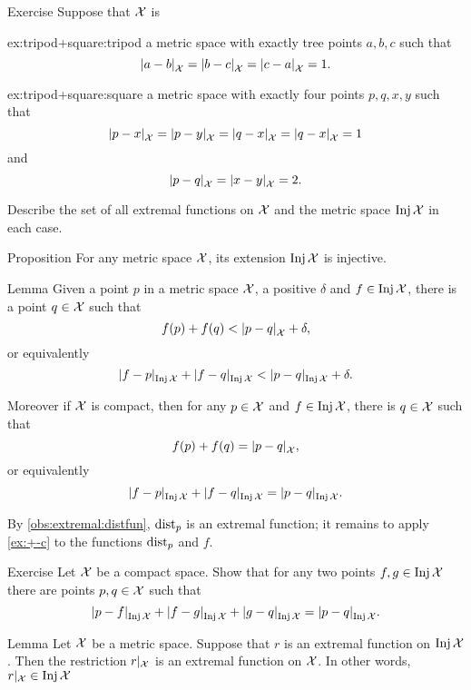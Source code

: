 \begin{thm}{Exercise}\label{ex:tripod+square}
Suppose that $\mathcal{X}$ is
\begin{subthm}{ex:tripod+square:tripod} 
a metric space with exactly tree points $a,b,c$ such that 
\[\dist{a}{b}{\spc{X}}=\dist{b}{c}{\spc{X}}=\dist{c}{a}{\spc{X}}=1.\]
\end{subthm}
\begin{subthm}{ex:tripod+square:square}
 a metric space with exactly four points $p,q,x,y$ such that 
\[\dist{p}{x}{\spc{X}}=\dist{p}{y}{\spc{X}}=\dist{q}{x}{\spc{X}}=\dist{q}{x}{\spc{X}}=1\]
and
\[\dist{p}{q}{\spc{X}}=\dist{x}{y}{\spc{X}}=2.\]
\end{subthm}
Describe the set of all extremal functions on $\mathcal{X}$ and the metric space $\mathop{\rm Inj}\nolimits \mathcal{X}$ in each case.
\end{thm}

\begin{thm}{Proposition}\label{prop:InjX-is-injective}
For any metric space $\mathcal{X}$, its extension $\mathop{\rm Inj}\nolimits\mathcal{X}$ is  injective.
\end{thm}

\begin{thm}{Lemma}\label{lem:opposite}
Given a point $p$ in a metric space $\mathcal{X}$, a positive $\delta$ and $f\in \mathop{\rm Inj}\nolimits\mathcal{X}$, there is a point $q\in \mathcal{X}$
such that 
\[f(p)+f(q)<\dist{p}{q}{\spc{X}}+\delta,\]
or equivalently 
\[\dist{f}{p}{\Inj\spc{X}}+\dist{f}{q}{\Inj\spc{X}}<\dist{p}{q}{\Inj\spc{X}}+\delta.\]

Moreover if $\mathcal{X}$ is compact, then for any $p\in\mathcal{X}$ and $f\in \mathop{\rm Inj}\nolimits\mathcal{X}$, there is $q\in \mathcal{X}$ such that 
\[f(p)+f(q)=\dist{p}{q}{\spc{X}},\]
or equivalently 
\[\dist{f}{p}{\Inj\spc{X}}+\dist{f}{q}{\Inj\spc{X}}=\dist{p}{q}{\Inj\spc{X}}.\]
\end{thm}

By \ref{obs:extremal:distfun}, $\mathrm{dist}_p$ is an extremal function;
it remains to apply \ref{ex:+-c} to the functions $\mathrm{dist}_p$ and $f$.
\qeds

\begin{thm}{Exercise}\label{ex:4-on-a-line}
Let $\mathcal{X}$ be a compact space.
Show that for any two points $f,g\in\mathop{\rm Inj}\nolimits \mathcal{X}$ there are points $p,q\in \mathcal{X}$
such that 
\[\dist{p}{f}{\Inj\spc{X}}+\dist{f}{g}{\Inj\spc{X}}+\dist{g}{q}{\Inj\spc{X}}=\dist{p}{q}{\Inj\spc{X}}.\]
\end{thm}


\begin{thm}{Lemma}\label{lem:r|X-extremal}
Let $\mathcal{X}$ be a metric space.
Suppose that $r$ is an extremal function on $\mathop{\rm Inj}\nolimits \mathcal{X}$.
Then the restriction $r|_{\mathcal{X}}$ is an extremal function on $\mathcal{X}$.
In other words, $r|_{\mathcal{X}}\in \mathop{\rm Inj}\nolimits \mathcal{X}$
\end{thm}


